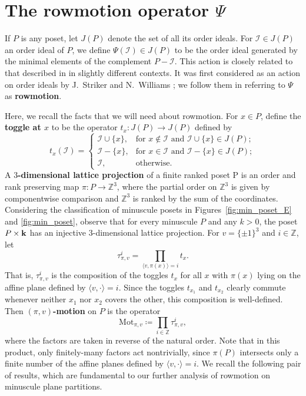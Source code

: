 \documentclass[12pt]{amsart}
\theoremstyle{definition}
\theoremstyle{remark}
\numberwithin{equation}{section}
\newcommand{\mot}{\ensuremath{\mathrm{Mot}}}
\newcommand{\uu}{\mathcal{I}}
\begin{document}
\section{The rowmotion operator $\Psi$}\label{sec:rowmotion}

If $P$ is any poset, let $J(P)$ denote the set of all its order ideals. For $\uu \in J(P)$ an order ideal of $P$, we define $\Psi(\uu) \in J(P)$ to be the order ideal generated by the minimal elements of the complement $P - \uu$. This action is closely related to that described in \cite{Brouwer.Schrijver,Duchet,Cameron.Fonderflaass} in slightly different contexts. It was first considered as an action on order ideals by J.~Striker and N.~Williams \cite{Striker.Williams}; we follow them in referring to $\Psi$ as {\bf rowmotion}.

Here, we recall the facts that we will need about rowmotion. For $x \in P$, define the {\bf toggle at $x$} to be the operator $t_x : J(P) \to J(P)$ defined by
\[
t_x(\uu) = \left\{ \begin{array}{ll}
        \uu \cup \{x\}, & \text{for } x \notin \uu \text{ and } \uu \cup \{x\} \in J(P); \\
        \uu - \{x\}, & \text{for } x \in \uu \text{ and } \uu - \{x\} \in J(P);\\
        \uu, & \text{otherwise. }
        \end{array} \right.
\]
A {\bf $3$-dimensional lattice projection} of a finite ranked poset P is an order and rank preserving map $\pi : P \to \mathbb{Z}^3$, where the partial order on $\mathbb{Z}^3$ is given by componentwise comparison and $\mathbb{Z}^3$ is ranked by the sum of the coordinates. Considering the classification of minuscule posets in Figures~\ref{fig:min_poset_E} and \ref{fig:min_poset}, observe that for every minuscule $P$ and any $k > 0$, the poset $P \times {\bf k}$ has an injective $3$-dimensional lattice projection. For $v = \{\pm 1 \}^3$ and $i \in \mathbb{Z}$, let 
\[
\tau_{\pi,v}^i = \prod_{\langle v, \pi(x) \rangle = i} t_x.
\]
That is, $\tau_{\pi,v}^i$ is the composition of the toggles $t_x$ for all $x$ with $\pi(x)$ lying on the affine plane defined by $\langle v, \cdot \rangle = i$. Since the toggles $t_{x_1}$ and $t_{x_2}$ clearly commute whenever neither $x_1$ nor $x_2$ covers the other, this composition is well-defined. Then {\bf  $(\pi, v)$-motion} on $P$ is the operator
\[
\mot_{\pi, v} \coloneqq \prod_{i \in \mathbb{Z}} \tau_{\pi,v}^i,
\]
where the factors are taken in reverse of the natural order. Note that in this product, only finitely-many factors act nontrivially, since $\pi(P)$ intersects only a finite number of the affine planes defined by $\langle v, \cdot \rangle = i$. We recall the following pair of results, which are fundamental to our further analysis of rowmotion on minuscule plane partitions.
\end{document}
